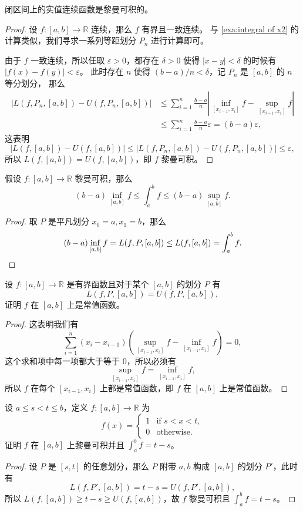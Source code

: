 \documentclass[fontset=none]{Notes}
\newcommand{\abs}[1]{\left|#1\right|}
\begin{document}
\begin{theorem}[连续函数黎曼可积]
  闭区间上的实值连续函数是黎曼可积的。
\end{theorem}
\begin{proof}
  设 $f:[a,b]\to \mathbb{R}$ 连续，那么 $f$ 有界且一致连续。
  与 \autoref{exa:integral of x2} 的计算类似，我们寻求一系列等距划分 $P_n$
  进行计算即可。

  由于 $f$ 一致连续，所以任取 $\varepsilon>0$，都存在 $\delta>0$
  使得 $|x-y|<\delta$ 的时候有 $|f(x)-f(y)|<\varepsilon$。
  此时存在 $n$ 使得 $(b-a)/n<\delta$，记 $P_n$ 是 $[a,b]$ 的 $n$ 等分划分，
  那么
  \begin{align*}
    \abs{L(f,P_n,[a,b])-U(f,P_n,[a,b])}&\leq 
    \sum_{i=1}^n\frac{b-a}{n}\abs{\inf_{[x_{i-1},x_i]}f-\sup_{[x_{i-1},x_i]} f}\\
    &\leq  \sum_{i=1}^n\frac{b-a}{n}\varepsilon=(b-a)\varepsilon,
  \end{align*}
  这表明
  \[
    \abs{L(f,[a,b])-U(f,[a,b])}\leq \abs{L(f,P_n,[a,b])-U(f,P_n,[a,b])}\leq
    \varepsilon,
  \]
  所以 $L(f,[a,b])=U(f,[a,b])$，即 $f$ 黎曼可积。
\end{proof}

\begin{proposition}
  假设 $f:[a,b]\to \mathbb{R}$ 黎曼可积，那么
  \[
    (b-a)\inf_{[a,b]}f\leq \int_a^b f\leq (b-a)\sup_{[a,b]}f.
  \]
\end{proposition}
\begin{proof}
  取 $P$ 是平凡划分 $x_0=a,x_1=b$，那么 
  \[
    (b-a)\inf_{[a,b]}f=L(f,P,[a,b])\leq L(f,[a,b])=\int_a^b f
    .\qedhere
  \]
\end{proof}

\begin{problem}{}{}
  设 $f:[a,b]\to \mathbb{R}$ 是有界函数且对于某个 $[a,b]$ 的划分 $P$
  有
  \[
    L(f,P,[a,b])=U(f,P,[a,b]),
  \]
  证明 $f$ 在 $[a,b]$ 上是常值函数。
\end{problem}
\begin{proof}
  这表明我们有
  \[
    \sum_{i=1}^n (x_i-x_{i-1})\left(\sup_{[x_{i-1},x_i]}f-\inf_{[x_{i-1},x_i]}f\right)=0,
  \]
  这个求和项中每一项都大于等于 $0$，所以必须有
  \[
    \sup_{[x_{i-1},x_i]}f=\inf_{[x_{i-1},x_i]}f,
  \]
  所以 $f$ 在每个 $[x_{i-1},x_i]$ 上都是常值函数，即 $f$ 在 $[a,b]$ 上是常值函数。
\end{proof}

\begin{problem}{}{}
  设 $a\leq s<t\leq b$，定义 $f:[a,b]\to \mathbb{R}$ 为
  \[
    f(x)=\begin{cases}
      1 & \text{if $s<x<t$},\\
      0 & \text{otherwise}.
    \end{cases}
  \]
  证明 $f$ 在 $[a,b]$ 上黎曼可积并且 $\int_a^b f=t-s$。
\end{problem}
\begin{proof}
  设 $P$ 是 $[s,t]$ 的任意划分，那么 $P$ 附带 $a,b$ 构成 $[a,b]$
  的划分 $P'$，此时有
  \[
    L(f,P',[a,b])=t-s=U(f,P',[a,b]),
  \]
  所以 $L(f,[a,b])\geq t-s\geq U(f,[a,b])$，故 $f$ 黎曼可积且
  $\int_a^b f=t-s$。
\end{proof}
\end{document}
